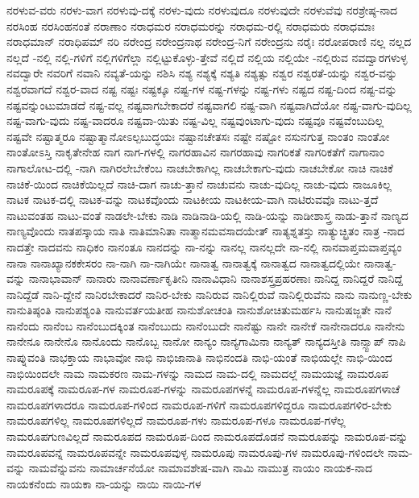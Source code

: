 {ನರಳುವ-ವರು
ನರಳು-ವಾಗ
ನರಳುವು-ದಕ್ಕೆ
ನರಳು-ವುದು
ನರಳುವುದೂ
ನರಳುವುದೇ
ನರಳುವೆವು
ನರಶ್ರೇಷ್ಠ-ನಾದ
ನರಸಿಂಹ
ನರಸಿಂಹನಂತೆ
ನರಾಣಾಂ
ನರಾಧಮರ
ನರಾಧಮರನ್ನು
ನರಾಧಮ-ರಲ್ಲಿ
ನರಾಧಮರು
ನರಾಧಮಾಃ
ನರಾಧಮಾನ್
ನರಾಧಿಪಮ್
ನರಿ
ನರೇಂದ್ರ
ನರೇಂದ್ರನಾಥ
ನರೇಂದ್ರ-ನಿಗೆ
ನರೇಂದ್ರನು
ನರೈಃ
ನರೋಪರಾಣಿ
ನಲ್ಲ
ನಲ್ಲದ
ನಲ್ಲದೆ
-ನಲ್ಲಿ
ನಲ್ಲಿ-ಗಳಿಗೆ
ನಲ್ಲಿಗಳಿಗೆಲ್ಲಾ
ನಲ್ಲಿಟ್ಟುಕೊಳ್ಳು-ತ್ತೇವೆ
ನಲ್ಲಿದೆ
ನಲ್ಲಿಯ
ನಲ್ಲಿಯೇ
-ನಲ್ಲಿರುವ
ನವದ್ವಾರಗಳುಳ್ಳ
ನವದ್ವಾರೇ
ನವರಿಗೆ
ನವಾನಿ
ನವ್ಯತೆ-ಯನ್ನು
ನಶಿಸಿ
ನಶ್ಯ
ನಶ್ಯಕ್ಕೆ
ನಶ್ಯತಿ
ನಶ್ಯತ್ಸು
ನಶ್ವರ
ನಶ್ವರತೆ-ಯನ್ನು
ನಶ್ವರ-ವನ್ನು
ನಶ್ವರವಾಗದೆ
ನಶ್ವರ-ವಾದ
ನಷ್ಟ
ನಷ್ಟಃ
ನಷ್ಟಕ್ಕೂ
ನಷ್ಟ-ಗಳ
ನಷ್ಟ-ಗಳನ್ನು
ನಷ್ಟ-ಗಳು
ನಷ್ಟದ
ನಷ್ಟ-ದಿಂದ
ನಷ್ಟ-ವನ್ನು
ನಷ್ಟವನ್ನುಂಟುಮಾಡದೆ
ನಷ್ಟ-ವಲ್ಲ
ನಷ್ಟವಾಗಬೇಕಾದರೆ
ನಷ್ಟವಾಗಲಿ
ನಷ್ಟ-ವಾಗಿ
ನಷ್ಟವಾಗಿದೆಯೋ
ನಷ್ಟ-ವಾಗು-ವುದಿಲ್ಲ
ನಷ್ಟ-ವಾಗು-ವುದು
ನಷ್ಟ-ವಾದರೂ
ನಷ್ಟವಾ-ಯಿತು
ನಷ್ಟ-ವಿಲ್ಲ
ನಷ್ಟವುಂಟಾಗು-ವುದು
ನಷ್ಟವೂ
ನಷ್ಟವೆಂಬುದಿಲ್ಲ
ನಷ್ಟವೇ
ನಷ್ಟಾತ್ಮರೂ
ನಷ್ಟಾತ್ಮಾನೋಽಲ್ಪಬುದ್ಧಯಃ
ನಷ್ಟಾನಚೇತಸಃ
ನಷ್ಟೇ
ನಷ್ಟೋ
ನಸುನಗುತ್ತ
ನಾಂತಂ
ನಾಂತೋ
ನಾಂತೋಽಸ್ತಿ
ನಾಕೃತೇನೇಹ
ನಾಗ
ನಾಗ-ಗಳಲ್ಲಿ
ನಾಗರಹಾವಿನ
ನಾಗರಹಾವು
ನಾಗರಿಕತೆ
ನಾಗರಿಕತೆಗೆ
ನಾಗಾನಾಂ
ನಾಗಾಲೋಟ-ದಲ್ಲಿ
-ನಾಗಿ
ನಾಗಿರಲೇಬೇಕೆಂಬ
ನಾಚಬೇಕಾಗಿಲ್ಲ
ನಾಚಬೇಕಾಗು-ವುದು
ನಾಚಬೇಕೋ
ನಾಚಿ
ನಾಚಿಕೆ
ನಾಚಿಕೆ-ಯಿಂದ
ನಾಚಿಕೆಯಿಲ್ಲದೆ
ನಾಚಿ-ದಾಗ
ನಾಚು-ತ್ತಾನೆ
ನಾಚುವನು
ನಾಚು-ವುದಿಲ್ಲ
ನಾಚು-ವುದು
ನಾಜೂಕಿಲ್ಲ
ನಾಟಕ
ನಾಟಕ-ದಲ್ಲಿ
ನಾಟಕ-ವನ್ನು
ನಾಟಕವೊಂದು
ನಾಟಕೀಯ
ನಾಟಕೀಯ-ವಾಗಿ
ನಾಟಿರುವವೊ
ನಾಟು-ತ್ತದೆ
ನಾಟುವಂತಹ
ನಾಟು-ವಂತೆ
ನಾಡಲೇ-ಬೇಕು
ನಾಡಿ
ನಾಡಿನಾಡಿ-ಯಲ್ಲಿ
ನಾಡಿ-ಯನ್ನು
ನಾಡೀಶಾಸ್ತ್ರ
ನಾಡು-ತ್ತಾನೆ
ನಾಣ್ಯದ
ನಾಣ್ಯವೊಂದು
ನಾತಪಸ್ಕಾಯ
ನಾತಿ
ನಾತಿಮಾನಿತಾ
ನಾತ್ಮಾನಮವಸಾದಯೇತ್
ನಾತ್ಯಶ್ನತಸ್ತು
ನಾತ್ಯುಚ್ಛ್ರಿತಂ
ನಾತ್ರ
-ನಾದ
ನಾದತ್ತೇ
ನಾದವನು
ನಾಧಿಕಂ
ನಾನಂತೂ
ನಾನದನ್ನು
ನಾ-ನನ್ನು
ನಾನಲ್ಲ
ನಾನಲ್ಲದೇ
ನಾ-ನಲ್ಲಿ
ನಾನವಾಪ್ತಮವಾಪ್ತವ್ಯಂ
ನಾನಾ
ನಾನಾಖ್ಯಾನಕಕೇಸರಂ
ನಾ-ನಾಗಿ
ನಾ-ನಾಗಿಯೇ
ನಾನಾತ್ವ
ನಾನಾತ್ವಕ್ಕೆ
ನಾನಾತ್ವದ
ನಾನಾತ್ವದಲ್ಲಿಯೇ
ನಾನಾತ್ವ-ವನ್ನು
ನಾನಾಭಾವಾನ್
ನಾನಾರು
ನಾನಾವರ್ಣಾಕೃತೀನಿ
ನಾನಾವಿಧಾನಿ
ನಾನಾಶಸ್ತ್ರಪ್ರಹರಣಾಃ
ನಾನಿದ್ದ
ನಾನಿದ್ದರೆ
ನಾನಿದ್ದೆ
ನಾನಿದ್ದೆಡೆ
ನಾನಿ-ದ್ದೇನೆ
ನಾನಿರಬೇಕಾದರೆ
ನಾನಿರ-ಬೇಕು
ನಾನಿರುವ
ನಾನಿಲ್ಲಿರುವೆ
ನಾನಿಲ್ಲಿರುವೆನು
ನಾನು
ನಾನುಣ್ಣ-ಬೇಕು
ನಾನುತಿಷ್ಠಂತಿ
ನಾನುಪಶ್ಯಂತಿ
ನಾನುವರ್ತಯತೀಹ
ನಾನುಶೋಚಂತಿ
ನಾನುಶೋಚಿತುಮರ್ಹಸಿ
ನಾನುಷಜ್ಜತೇ
ನಾನೆ
ನಾನೆಂದು
ನಾನೆಂಬ
ನಾನೆಂಬುದಕ್ಕಿಂತ
ನಾನೆಂಬುದು
ನಾನೆಂಬುದೇ
ನಾನೆಷ್ಟು
ನಾನೇ
ನಾನೇಕೆ
ನಾನೇನಾದರೂ
ನಾನೇನು
ನಾನೇನೂ
ನಾನೇನೊ
ನಾನೊಂದು
ನಾನೊಬ್ಬ
ನಾನೋ
ನಾನ್ಯಂ
ನಾನ್ಯಗಾಮಿನಾ
ನಾನ್ಯತ್
ನಾನ್ಯದಸ್ತೀತಿ
ನಾನ್ಸ್ಟಾಪ್
ನಾಪಿ
ನಾಪ್ನುವಂತಿ
ನಾಭಕ್ತಾಯ
ನಾಭಾವೋ
ನಾಭಿ
ನಾಭಿಜಾನಾತಿ
ನಾಭಿನಂದತಿ
ನಾಭಿ-ಯಂತೆ
ನಾಭಿಯಲ್ಲೇ
ನಾಭಿ-ಯಿಂದ
ನಾಭಿಯಿಂದಲೇ
ನಾಮ
ನಾಮಕರಣ
ನಾಮ-ಗಳನ್ನು
ನಾಮದ
ನಾಮ-ದಲ್ಲಿ
ನಾಮದಲ್ಲೆ
ನಾಮಯಜ್ಞೆ
ನಾಮರೂಪ
ನಾಮರೂಪಕ್ಕೆ
ನಾಮರೂಪ-ಗಳ
ನಾಮರೂಪ-ಗಳನ್ನು
ನಾಮರೂಪಗಳನ್ನೆ
ನಾಮರೂಪ-ಗಳನ್ನೆಲ್ಲ
ನಾಮರೂಪಗಳಾಚೆ
ನಾಮರೂಪಗಳಾದರೂ
ನಾಮರೂಪ-ಗಳಿಂದ
ನಾಮರೂಪ-ಗಳಿಗೆ
ನಾಮರೂಪಗಳಿದ್ದರೂ
ನಾಮರೂಪಗಳಿರ-ಬೇಕು
ನಾಮರೂಪಗಳಿಲ್ಲ
ನಾಮರೂಪಗಳಿಲ್ಲದೆ
ನಾಮರೂಪ-ಗಳು
ನಾಮರೂಪ-ಗಳೂ
ನಾಮರೂಪ-ಗಳೆಲ್ಲ
ನಾಮರೂಪಗುಣವಿಲ್ಲದೆ
ನಾಮರೂಪದ
ನಾಮರೂಪ-ದಿಂದ
ನಾಮರೂಪದೊಡನೆ
ನಾಮರೂಪನ್ನು
ನಾಮರೂಪ-ವನ್ನು
ನಾಮರೂಪವನ್ನೆ
ನಾಮರೂಪವನ್ನೇ
ನಾಮರೂಪವುಳ್ಳ
ನಾಮರೂಪು
ನಾಮರೂಪು-ಗಳ
ನಾಮರೂಪು-ಗಳಿಂದಲೇ
ನಾಮ-ವನ್ನು
ನಾಮವೆನ್ನುವನು
ನಾಮಾರ್ಚನೆಯೋ
ನಾಮಾವಶೇಷ-ವಾಗಿ
ನಾಮಿ
ನಾಮುತ್ರ
ನಾಯಂ
ನಾಯಕ-ನಾದ
ನಾಯಕನೆಂದು
ನಾಯಕಾ
ನಾ-ಯನ್ನು
ನಾಯಿ
ನಾಯಿ-ಗಳ
}
